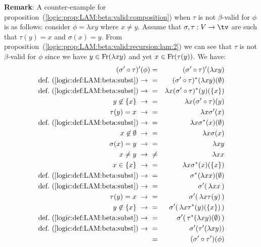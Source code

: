 \noindent
{\bf Remark}: A counter-example for
proposition~(\ref{logic:prop:LAM:beta:valid:composition}) when $\tau$ is not
$\beta$-valid for $\phi$ is as follows: consider $\phi=\lambda x y$ where
$x\neq y$. Assume that $\sigma,\tau:V\to\tv$ are such that
$\tau(y)=x$ and $\sigma(x)=y$. From
proposition~(\ref{logic:prop:LAM:beta:valid:recursion:lam:2}) we can see that
$\tau$ is not $\beta$-valid for $\phi$ since we have $y\in\mbox{\rm Fr}(\lambda x y)$
and yet $x\in\mbox{\rm Fr}(\tau(y))$. We have:
    \begin{eqnarray*}(\sigma'\circ\tau)' (\phi)
        &=&(\sigma'\circ\tau)' (\lambda x y)\\
        \mbox{def.~(\ref{logic:def:LAM:beta:subst})\ $\to$\ }
        &=&(\sigma'\circ\tau)^{*} (\lambda x y)(\emptyset)\\
        \mbox{def.~(\ref{logic:def:LAM:beta:subst})\ $\to$\ }
        &=&\lambda x(\sigma'\circ\tau)^{*} (y)(\{x\})\\
        y\not\in\{x\}\ \to\ 
        &=&\lambda x(\sigma'\circ\tau) (y)\\
        \tau(y)=x\ \to\ 
        &=&\lambda x\sigma'(x)\\
        \mbox{def.~(\ref{logic:def:LAM:beta:subst})\ $\to$\ }
        &=&\lambda x\sigma^{*}(x)(\emptyset)\\
        x\not\in\emptyset\ \to\ 
        &=&\lambda x\sigma(x)\\
        \sigma(x)=y\ \to\ 
        &=&\lambda x y\\
        x\neq y\ \to\ 
        &\neq&\lambda x x\\
        x\in\{x\}\ \to\ 
        &=&\lambda x \sigma^{*}(x)(\{x\})\\
        \mbox{def.~(\ref{logic:def:LAM:beta:subst})\ $\to$\ }
        &=&\sigma^{*}(\lambda x x)(\emptyset)\\
        \mbox{def.~(\ref{logic:def:LAM:beta:subst})\ $\to$\ }
        &=&\sigma'(\,\lambda x x\,)\\
        \tau(y)=x\ \to\ 
        &=&\sigma'(\,\lambda x\tau(y)\,)\\
        y\not\in\{x\}\ \to\ 
        &=&\sigma'(\,\lambda x\tau^{*}(y)(\{x\})\,)\\
        \mbox{def.~(\ref{logic:def:LAM:beta:subst})\ $\to$\ }
        &=&\sigma'(\,\tau^{*}(\lambda x y)(\emptyset)\,)\\
        \mbox{def.~(\ref{logic:def:LAM:beta:subst})\ $\to$\ }
        &=&\sigma'(\tau'(\lambda x y))\\
        &=&(\sigma'\circ\tau')(\phi)
    \end{eqnarray*}
